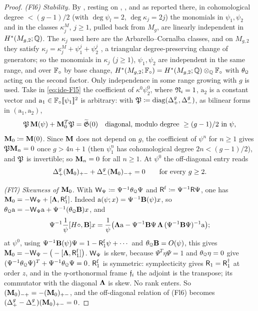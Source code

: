 \begin{proof}
\emph{(Fl6) Stability.} By \cite[2.17--2.19]{Tel12}, resting on \cite{Loo96}, \cite{MW07}, \cite{Har85} and \cite{Iva90} as reported there, in cohomological degree $<(g-1)/2$ (with $\deg\psi_l=2$, $\deg\kappa_j=2j$) the monomials in $\psi_1,\psi_2$ and in the classes $\kappa_j^{M}$, $j\geq 1$, pulled back from $M_g$, are linearly independent in $H^*(M_{g,2};\mathbb{Q})$. The $\kappa_j$ used here are the Arbarello--Cornalba classes, and on $M_{g,2}$ they satisfy $\kappa_j=\kappa_j^M+\psi_1^j+\psi_2^j$ \cite[(2.15)]{Tel12}, a triangular degree-preserving change of generators; so the monomials in $\kappa_j$ ($j\geq 1$), $\psi_1,\psi_2$ are independent in the same range, and over $\mathbb{F}_{\circ}$ by base change, $H^*(M_{g,2};\mathbb{F}_{\circ})=H^*(M_{g,2};\mathbb{Q})\otimes_{\mathbb{Q}}\mathbb{F}_{\circ}$ with $\theta_{\mathcal{Q}}$ acting on the second factor. Only independence in some range growing with $g$ is used. Take in \cref{eq:ide-Fl5} the coefficient of $\kappa^0\psi_2^0$, where $\mathfrak{N}_i=1$, $\mathrm{a}_2$ is a constant vector and $\mathrm{a}_1\in\mathbb{F}_{\circ}[\![ \psi_1 ]\!]^2$ is arbitrary: with $\mathfrak{P}\coloneqq\mathrm{diag}(\Delta_+^g,\Delta_-^g)$, as bilinear forms in $(\mathrm{a}_1,\mathrm{a}_2)$,
\[
\mathfrak{P}\,\mathbf{M}(\psi)+\mathbf{M}_0^T\mathfrak{P}=\widetilde{\mathfrak{G}}(0)\quad\text{diagonal, modulo degree}\ \geq(g-1)/2\ \text{in}\ \psi,
\]
$\mathbf{M}_0\coloneqq\mathbf{M}(0)$. Since $\mathbf{M}$ does not depend on $g$, the coefficient of $\psi^n$ for $n\geq 1$ gives $\mathfrak{P}\mathbf{M}_n=0$ once $g>4n+1$ (then $\psi_1^n$ has cohomological degree $2n<(g-1)/2$), and $\mathfrak{P}$ is invertible; so $\mathbf{M}_n=0$ for all $n\geq 1$. At $\psi^0$ the off-diagonal entry reads
\[
\Delta_+^g(\mathbf{M}_0)_{+-}+\Delta_-^g(\mathbf{M}_0)_{-+}=0\qquad\text{for every }g\geq 2 .
\]

\emph{(Fl7) Skewness of $\mathbf{M}_0$.} With $\mathsf{W}_{\Psi}\coloneqq\Psi^{-1}\theta_{\mathcal{Q}}\Psi$ and $\mathsf{R}^{\mathrm{f}}\coloneqq\Psi^{-1}\mathsf{R}\Psi$, one has $\mathbf{M}_0=-\mathsf{W}_{\Psi}+[\boldsymbol{\Lambda},\mathsf{R}^{\mathrm{f}}_1]$. Indeed $\mathrm{a}(\psi;x)=\Psi^{-1}\mathbf{B}(\psi)x$, so $\theta_{\mathcal{Q}}\mathrm{a}=-\mathsf{W}_{\Psi}\mathrm{a}+\Psi^{-1}(\theta_{\mathcal{Q}}\mathbf{B})x$, and
\[
\Psi^{-1}\frac1\psi[H\circ,\mathbf{B}]x=\frac1\psi\big(\boldsymbol{\Lambda}\mathrm{a}-\Psi^{-1}\mathbf{B}\Psi\,\boldsymbol{\Lambda}\,(\Psi^{-1}\mathbf{B}\Psi)^{-1}\mathrm{a}\big);
\]
at $\psi^0$, using $\Psi^{-1}\mathbf{B}(\psi)\Psi=1-\mathsf{R}^{\mathrm{f}}_1\psi+\cdots$ and $\theta_{\mathcal{Q}}\mathbf{B}=O(\psi)$, this gives $\mathbf{M}_0=-\mathsf{W}_{\Psi}-\big(-[\boldsymbol{\Lambda},\mathsf{R}^{\mathrm{f}}_1]\big)$. $\mathsf{W}_{\Psi}$ is skew, because $\Psi^T\eta\Psi=1$ and $\theta_{\mathcal{Q}}\eta=0$ give $(\Psi^{-1}\theta_{\mathcal{Q}}\Psi)^T+\Psi^{-1}\theta_{\mathcal{Q}}\Psi=0$. $\mathsf{R}^{\mathrm{f}}_1$ is symmetric: symplecticity gives $\mathsf{R}_1=\mathsf{R}_1^\dagger$ at order $z$, and in the $\eta$-orthonormal frame $\mathfrak{f}_i$ the adjoint is the transpose; its commutator with the diagonal $\boldsymbol{\Lambda}$ is skew. No rank enters. So $(\mathbf{M}_0)_{-+}=-(\mathbf{M}_0)_{+-}$, and the off-diagonal relation of (Fl6) becomes $(\Delta_+^g-\Delta_-^g)(\mathbf{M}_0)_{+-}=0$.


\end{proof}
